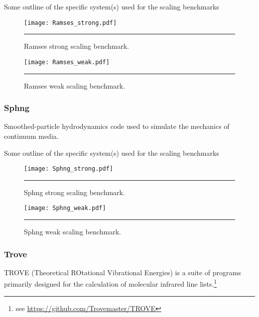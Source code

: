 \documentclass[10pt]{article}
\begin{document}
{\color{red} Some outline of the specific system(s) used for the scaling benchmarks}

\begin{figure*}[h!]
	\centering
	\texttt{[image: Ramses\_strong.pdf]}
	\vspace{0.1cm}
	\hrule
	\vspace{0.01cm}
	\caption{Ramses strong scaling benchmark.}
	\label{fig::ramses_ss}
\end{figure*}


\begin{figure*}[h!]
	\centering
	\texttt{[image: Ramses\_weak.pdf]}
	\vspace{0.1cm}
	\hrule
	\vspace{0.01cm}
	\caption{Ramses weak scaling benchmark.}
	\label{fig::ramses_ws}
\end{figure*}


\clearpage
\subsubsection{Sphng}
Smoothed-particle hydrodynamics code used to simulate the mechanics of
continuum media.

{\color{red} Some outline of the specific system(s) used for the scaling benchmarks}


\begin{figure*}[h!]
	\centering
	\texttt{[image: Sphng\_strong.pdf]}
	\vspace{0.1cm}
	\hrule
	\vspace{0.01cm}
	\caption{Sphng strong scaling benchmark.}
	\label{fig::sphng_ss}
\end{figure*}


\begin{figure*}[h!]
	\centering
	\texttt{[image: Sphng\_weak.pdf]}
	\vspace{0.1cm}
	\hrule
	\vspace{0.01cm}
	\caption{Sphng weak scaling benchmark.}
	\label{fig::sphng_ws}
\end{figure*}


\clearpage
\subsubsection{Trove}
TROVE (Theoretical ROtational Vibrational Energies) is a suite of programs
primarily designed for the calculation of molecular infrared line lists.\footnote{see \url{https://github.com/Trovemaster/TROVE}}
\end{document}
